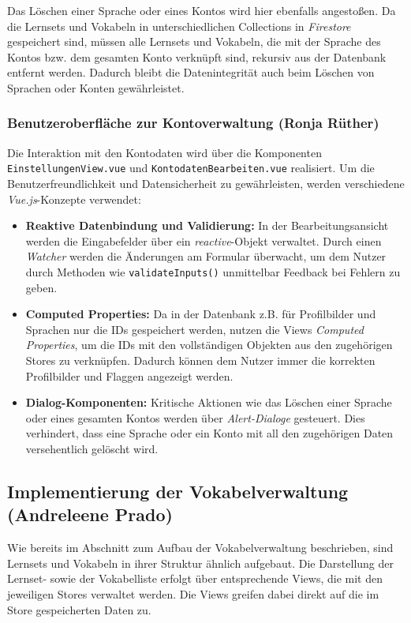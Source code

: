 Das Löschen einer Sprache oder eines Kontos wird hier ebenfalls angestoßen. Da die Lernsets und Vokabeln in unterschiedlichen Collections in \textit{Firestore} gespeichert sind, müssen alle Lernsets und Vokabeln,
die mit der Sprache des Kontos bzw. dem gesamten Konto verknüpft sind, rekursiv aus der Datenbank entfernt werden. Dadurch bleibt die Datenintegrität auch beim Löschen von Sprachen oder Konten gewährleistet.

\subsubsection{Benutzeroberfläche zur Kontoverwaltung (Ronja Rüther)}
Die Interaktion mit den Kontodaten wird über die Komponenten \texttt{EinstellungenView.vue} und \texttt{KontodatenBearbeiten.vue} realisiert. 
Um die Benutzerfreundlichkeit und Datensicherheit zu gewährleisten, werden verschiedene \textit{Vue.js}-Konzepte verwendet:

\begin{itemize}
\item \textbf{Reaktive Datenbindung und Validierung:} In der Bearbeitungsansicht werden die Eingabefelder über ein \textit{reactive}-Objekt verwaltet. Durch einen \textit{Watcher} werden die Änderungen am Formular überwacht, um dem Nutzer durch Methoden wie \texttt{validateInputs()} unmittelbar Feedback bei Fehlern zu geben.
\item \textbf{Computed Properties:} Da in der Datenbank z.B. für Profilbilder und Sprachen nur die IDs gespeichert werden, nutzen die Views \textit{Computed Properties}, um die IDs mit den vollständigen Objekten aus den zugehörigen Stores zu verknüpfen. Dadurch können dem Nutzer immer die korrekten Profilbilder und Flaggen angezeigt werden.
\item \textbf{Dialog-Komponenten:} Kritische Aktionen wie das Löschen einer Sprache oder eines gesamten Kontos werden über \textit{Alert-Dialoge} gesteuert. Dies verhindert, dass eine Sprache oder ein Konto mit all den zugehörigen Daten versehentlich gelöscht wird.
\end{itemize}

\subsection{Implementierung der Vokabelverwaltung (Andreleene Prado)}
Wie bereits im Abschnitt zum Aufbau der Vokabelverwaltung beschrieben, sind Lernsets und Vokabeln in ihrer Struktur ähnlich aufgebaut.
Die Darstellung der Lernset- sowie der Vokabelliste erfolgt über entsprechende Views, die mit den jeweiligen Stores verwaltet werden.
Die Views greifen dabei direkt auf die im Store gespeicherten Daten zu.


